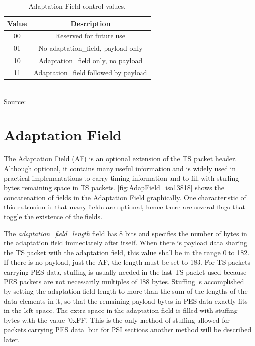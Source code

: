 \documentclass[
	12pt,				%
	openright,			%
	twoside,			%
	a4paper,			%
	brazil,
	french,				%
	english
	]{abntex2}
\begin{document}
\begin{table}[!hb]
\caption{Adaptation Field control values.}
\begin{center}
\begin{tabular}{|c|c|}
\hline
Value & Description \\
\hline
00 & Reserved for future use\\
\hline
01 & No adaptation\_field, payload only\\
\hline
10 & Adaptation\_field only, no payload\\
\hline
11 & Adaptation\_field followed by payload\\
\hline
\end{tabular}
\label{tab_adapataion_field}
\\Source: 
\end{center}
\end{table}

\section{Adaptation Field}

The Adaptation Field (AF) is an optional extension of the TS packet header. Although optional, it contains many useful information and is widely used in practical implementations to carry timing information and to fill with stuffing bytes remaining space in TS packets. \autoref{fig:AdapField_iso13818} shows the concatenation of fields in the Adaptation Field graphically. One characteristic of this extension is that many fields are optional, hence there are several flags that toggle the existence of the fields.

The \textit{adaptation\_field\_length} field has 8 bits and specifies the number of bytes in the adaptation field immediately after itself. When there is payload data sharing the TS packet with the adaptation field, this value shall be in the range 0 to 182. If there is no payload, just the AF, the length must be set to 183. For TS packets carrying PES data, stuffing is usually needed in the last TS packet used because PES packets are not necessarily multiples of 188 bytes. Stuffing is accomplished by setting the adaptation field length to more than the sum of the lengths of the data elements in it, so that the remaining payload bytes in PES data exactly fits in the left space. The extra space in the adaptation field is filled with stuffing bytes with the value '0xFF'. This is the only method of stuffing allowed for packets carrying PES data, but for PSI sections another method will be described later.
\end{document}
